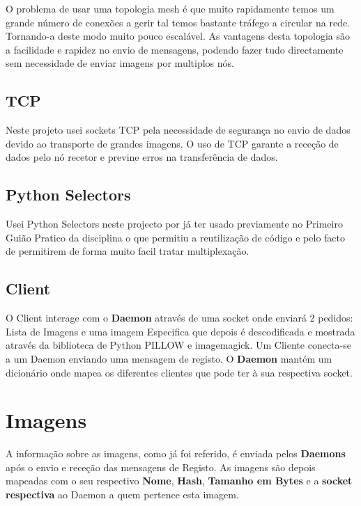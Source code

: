 \documentclass[12pt, letterpaper, twoside]{article}
\begin{document}
	O problema de usar uma topologia mesh é que muito rapidamente temos um grande número de conexões a gerir tal temos bastante tráfego a circular na rede. Tornando-a deste modo muito pouco escalável. As vantagens desta topologia são a facilidade e rapidez no envio de mensagens, podendo fazer tudo directamente sem necessidade de enviar imagens por multiplos nós.
	
	\subsection{TCP}
	Neste projeto usei sockets TCP pela necessidade de segurança no envio de dados devido ao transporte de grandes imagens. O uso de TCP garante a receção de dados pelo nó recetor e previne erros na transferência de dados.
	
	\subsection*{Python Selectors}
	Usei Python Selectors neste projecto por já ter usado previamente no Primeiro Guião Pratico da disciplina o que permitiu a reutilização de código e pelo facto de permitirem de forma muito facil tratar multiplexação.
	
	\subsection{Client}
	O Client interage com o \textbf{Daemon} através de uma socket onde enviará 2 pedidos: Lista de Imagens e uma imagem Especifica que depois é descodificada e mostrada através da biblioteca de Python PILLOW e imagemagick. Um Cliente conecta-se a um Daemon enviando uma mensagem de registo. O \textbf{Daemon} mantém um dicionário onde mapea os diferentes clientes que pode ter à sua respectiva socket.
	
	\section{Imagens}
	A informação sobre as imagens, como já foi referido, é enviada pelos \textbf{Daemons} após o envio e receção das mensagens de Registo. As imagens são depois mapeadas com o seu respectivo \textbf{Nome}, \textbf{Hash}, \textbf{Tamanho em Bytes} e a \textbf{socket respectiva} ao Daemon a quem pertence esta imagem. 
	
\end{document}
